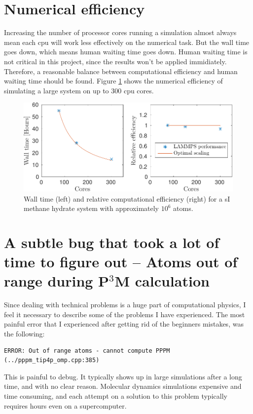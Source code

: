 \section{Numerical efficiency}
Increasing the number of processor cores running a simulation almost always mean each cpu will work less effectively on the numerical task. But the wall time goes down, which means human waiting time goes down. Human waiting time is not critical in this project, since the results won't be applied immidiately. Therefore, a reasonable balance between computational efficiency and human waiting time should be found. Figure \ref{fig:lammps_efficiency} shows the numerical efficiency of simulating a large system on up to 300 cpu cores.

\begin{figure}
\includegraphics[width=\textwidth]{../figures/thesis/lammps_efficiency.pdf}
\caption{Wall time (left) and relative computational efficiency (right) for a sI methane hydrate system with approximately $10^6$ atoms.}
\label{fig:lammps_efficiency}
\end{figure}

\section{A subtle bug that took a lot of time to figure out -- Atoms out of range during P$^3$M calculation}

Since dealing with technical problems is a huge part of computational physics, I feel it necessary to describe some of the problems I have experienced. The most painful error that I experienced after getting rid of the beginners mistakes, was the following:

\begin{verbatim}
ERROR: Out of range atoms - cannot compute PPPM (../pppm_tip4p_omp.cpp:385)
\end{verbatim}

This is painful to debug. It typically shows up in large simulations after a long time, and with no clear reason. Molecular dynamics simulations expensive and time consuming, and each attempt on a solution to this problem typically requires hours even on a supercomputer. 

